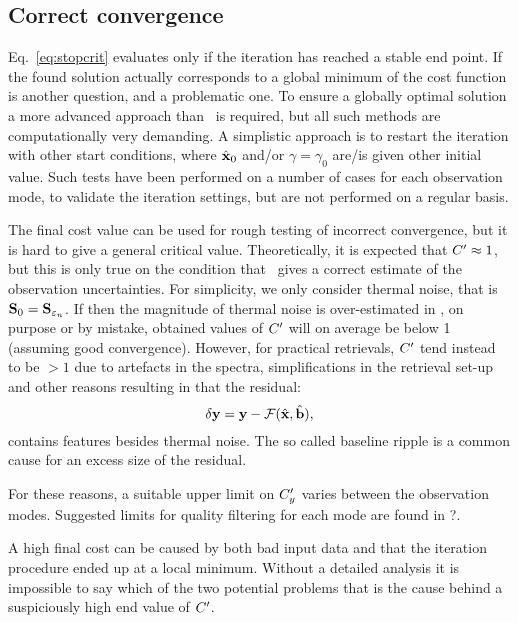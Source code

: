 \subsection{Correct convergence}
%
Eq.~\ref{eq:stopcrit} evaluates only if the iteration has reached a stable end
point. If the found solution actually corresponds to a global minimum of the
cost function is another question, and a problematic one. To ensure a globally
optimal solution a more advanced approach than \LM\ is required, but all
such methods are computationally very demanding. A simplistic approach is to
restart the iteration with other start conditions, where $\hat{\mathbf{x}}_0$ and/or
$\gamma=\gamma_0$ are/is given other initial value. Such tests have been
performed on a number of cases for each observation mode, to validate the
iteration settings, but are not performed on a regular basis.

The final cost value can be used for rough testing of incorrect convergence,
but it is hard to give a general critical value. Theoretically, it is expected
that $C'\approx1$, but this is only true on the condition that
\ gives a correct estimate of the observation uncertainties. For
simplicity, we only consider thermal noise, that is
$\mathbf{S}_{0}=\mathbf{S}_{\varepsilon_n}$. If then the magnitude of thermal noise is
over-estimated in , on purpose or by mistake, obtained values of
$C'$  will on average be below 1 (assuming good convergence). However, for
practical retrievals, $C'$ tend instead to be $>1$ due to artefacts in
the spectra, simplifications in the retrieval set-up and other reasons
resulting in that the residual:
\begin{equation}
  \label{eq:dy}
  \delta\mathbf{y} = \mathbf{y}-\mathcal{F}(\hat{\mathbf{x}},\hat{\mathbf{b}}),
\end{equation}
contains features besides thermal noise. The so called baseline ripple is a common
cause for an excess size of the residual.

For these reasons, a suitable upper limit on $C_y'$ varies between the
observation modes. Suggested limits for quality filtering for each mode are found
in ?. 

A high final cost can be caused by both bad input data and that the iteration
procedure ended up at a local minimum. Without a detailed analysis it is
impossible to say which of the two potential problems that is the cause behind
a suspiciously high end value of $C'$.


